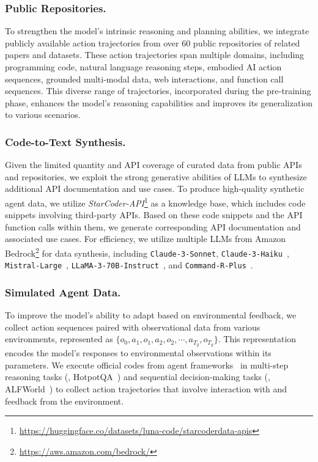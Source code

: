 \subsubsection{Public Repositories.}
To strengthen the model's intrinsic reasoning and planning abilities, we integrate publicly available action trajectories from over $60$ public repositories of related papers and datasets. These action trajectories span multiple domains, including programming code, natural language reasoning steps, embodied AI action sequences, grounded multi-modal data, web interactions, and function call sequences. This diverse range of trajectories, incorporated during the pre-training phase, enhances the model's reasoning capabilities and improves its generalization to various scenarios.

\subsubsection{Code-to-Text Synthesis.}
Given the limited quantity and API coverage of curated data from public APIs and repositories, we exploit the strong generative abilities of LLMs to synthesize additional API documentation and use cases. To produce high-quality synthetic agent data, we utilize \emph{StarCoder-API}\footnote{\url{https://huggingface.co/datasets/luna-code/starcoderdata-apis}} as a knowledge base, which includes code snippets involving third-party APIs. Based on these code snippets and the API function calls within them, we generate corresponding API documentation and associated use cases.
For efficiency, we utilize multiple LLMs from Amazon Bedrock\footnote{\url{https://aws.amazon.com/bedrock/}} for data synthesis, including \texttt{Claude-3-Sonnet}, \texttt{Claude-3-Haiku}~\cite{claude-3}, \texttt{Mistral-Large}~\cite{mistral-large}, \texttt{LLaMA-3-70B-Instruct}~\cite{dubey2024llama}, and \texttt{Command-R-Plus}~\cite{command-r-plus}.


\subsubsection{Simulated Agent Data.}
To improve the model's ability to adapt based on environmental feedback, we collect action sequences paired with observational data from various environments, represented as $\{o_0, a_1, o_1, a_2, o_2, \cdots, a_{T_g}, o_{T_g}\}$. This representation encodes the model's responses to environmental observations within its parameters. We execute official codes from agent frameworks~\cite{yao2022react, sun2024adaplanner, wang2024llms, shinn2024reflexion} in multi-step reasoning tasks (\eg, HotpotQA~\cite{yang2018hotpotqa}) and sequential decision-making tasks (\eg, ALFWorld~\cite{shridhar2021alfworld}) to collect action trajectories that involve interaction with and feedback from the environment.

